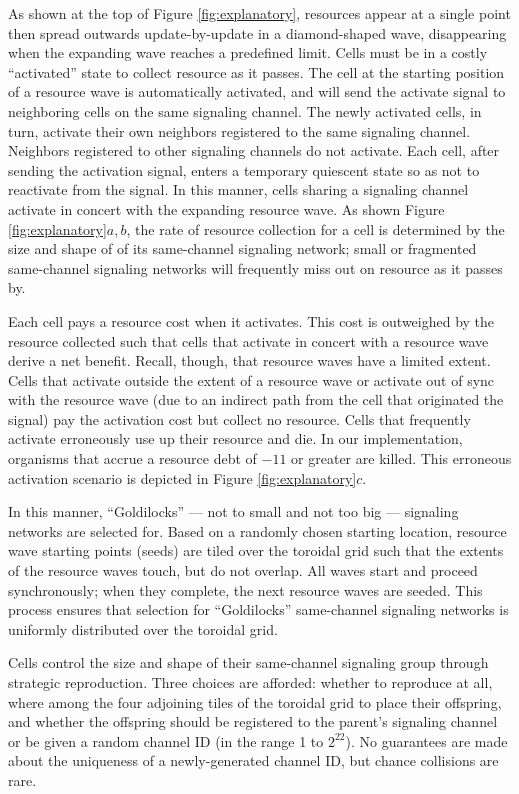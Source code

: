 As shown at the top of Figure \ref{fig:explanatory}, resources appear at a single point then spread outwards update-by-update in a diamond-shaped wave, disappearing when the expanding wave reaches a predefined limit.
Cells must be in a costly ``activated'' state to collect resource as it passes.
The cell at the starting position of a resource wave is automatically activated, and will send the activate signal to neighboring cells on the same signaling channel.
The newly activated cells, in turn, activate their own neighbors registered to the same signaling channel.
Neighbors registered to other signaling channels do not activate.
Each cell, after sending the activation signal, enters a temporary quiescent state so as not to reactivate from the signal.
In this manner, cells sharing a signaling channel activate in concert with the expanding resource wave.
As shown Figure \ref{fig:explanatory}$a,b$, the rate of resource collection for a cell is determined by the size and shape of of its same-channel signaling network;
small or fragmented same-channel signaling networks will frequently miss out on resource as it passes by.

Each cell pays a resource cost when it activates.
This cost is outweighed by the resource collected such that cells that activate in concert with a resource wave derive a net benefit.
Recall, though, that resource waves have a limited extent.
Cells that activate outside the extent of a resource wave or activate out of sync with the resource wave (due to an indirect path from the cell that originated the signal) pay the activation cost but collect no resource.
Cells that frequently activate erroneously use up their resource and die.
In our implementation, organisms that accrue a resource debt of $-11$ or greater are killed.
This erroneous activation scenario is depicted in Figure \ref{fig:explanatory}$c$.

In this manner, ``Goldilocks'' --- not to small and not too big --- signaling networks are selected for.
Based on a randomly chosen starting location, resource wave starting points (seeds) are tiled over the toroidal grid such that the extents of the resource waves touch, but do not overlap.
All waves start and proceed synchronously;
when they complete, the next resource waves are seeded.
This process ensures that selection for ``Goldilocks'' same-channel signaling networks is uniformly distributed over the toroidal grid.

Cells control the size and shape of their same-channel signaling group through strategic reproduction.
Three choices are afforded: whether to reproduce at all, where among the four adjoining tiles of the toroidal grid to place their offspring, and whether the offspring should be registered to the parent's signaling channel or be given a random channel ID (in the range 1 to $2^{22}$).
No guarantees are made about the uniqueness of a newly-generated channel ID, but chance collisions are rare.

